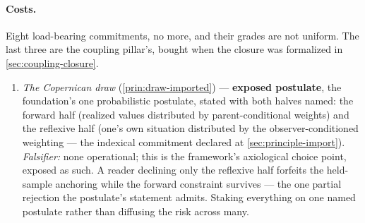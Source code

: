 \documentclass[11pt]{article}
\theoremstyle{definition}
\begin{document}
\paragraph{Costs.} Eight load-bearing commitments, no more, and their grades are not uniform. The last three are the coupling pillar's, bought when the closure was formalized in \autoref{sec:coupling-closure}.
\begin{enumerate}
    \item \emph{The Copernican draw} (\autoref{prin:draw-imported}) --- \textbf{exposed postulate}, the foundation's one probabilistic postulate, stated with both halves named: the forward half (realized values distributed by parent-conditional weights) and the reflexive half (one's own situation distributed by the observer-conditioned weighting --- the indexical commitment declared at \autoref{sec:principle-import}). \emph{Falsifier:} none operational; this is the framework's axiological choice point, exposed as such. A reader declining only the reflexive half forfeits the held-sample anchoring while the forward constraint survives --- the one partial rejection the postulate's statement admits. Staking everything on one named postulate rather than diffusing the risk across many.

\end{enumerate}
\end{document}

